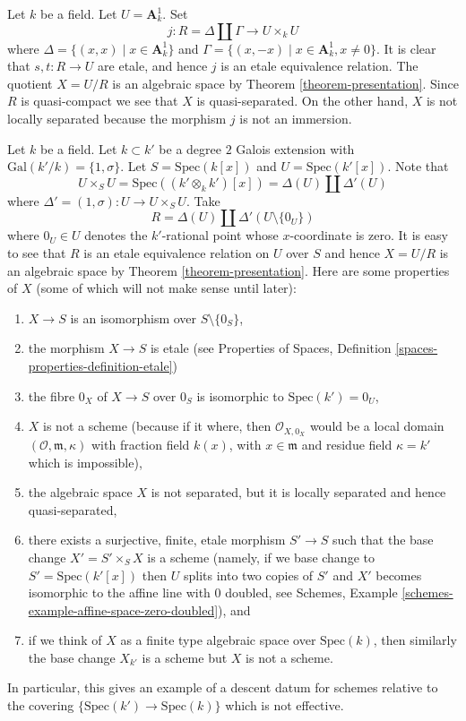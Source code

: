 \begin{example}
\label{example-affine-line-involution}
Let $k$ be a field. Let $U = \mathbf{A}^1_k$. Set
$$
j : R = \Delta \coprod \Gamma \longrightarrow U \times_k U
$$
where $\Delta = \{(x, x) \mid x \in \mathbf{A}^1_k\}$ and
$\Gamma = \{(x, -x) \mid x \in \mathbf{A}^1_k, x \not = 0\}$.
It is clear that $s, t : R \to U$ are etale, and hence
$j$ is an etale equivalence relation.
The quotient $X = U/R$ is an algebraic space by
Theorem \ref{theorem-presentation}.
Since $R$ is quasi-compact we see that $X$ is quasi-separated.
On the other hand, $X$ is not locally separated because
the morphism $j$ is not an immersion.
\end{example}

\begin{example}
\label{example-non-representable-descent}
Let $k$ be a field. Let $k \subset k'$ be a degree $2$ Galois extension
with $\text{Gal}(k'/k) = \{1, \sigma\}$. Let $S = \text{Spec}(k[x])$
and $U = \text{Spec}(k'[x])$. Note that
$$
U \times_S U =
\text{Spec}((k' \otimes_k k')[x]) =
\Delta(U) \coprod \Delta'(U)
$$
where $\Delta' = (1, \sigma) : U \to U \times_S U$. Take
$$
R = \Delta(U) \coprod \Delta'(U \setminus \{0_U\})
$$
where $0_U \in U$ denotes the $k'$-rational point whose $x$-coordinate is zero.
It is easy to see that $R$ is an etale equivalence relation on $U$ over $S$
and hence $X = U/R$ is an algebraic space by
Theorem \ref{theorem-presentation}. Here are some properties of $X$ (some
of which will not make sense until later):
\begin{enumerate}
\item $X \to S$ is an isomorphism over $S \setminus \{0_S\}$,
\item the morphism $X \to S$ is etale (see
Properties of Spaces,
Definition \ref{spaces-properties-definition-etale})
\item the fibre $0_X$ of $X \to S$ over $0_S$ is isomorphic to
$\text{Spec}(k') = 0_U$,
\item $X$ is not a scheme (because if it where, then $\mathcal{O}_{X, 0_X}$
would be a local domain $(\mathcal{O}, \mathfrak m, \kappa)$ with
fraction field $k(x)$, with $x \in \mathfrak m$ and residue field
$\kappa = k'$ which is impossible),
\item the algebraic space $X$ is not separated, but it is
locally separated and hence quasi-separated,
\item there exists a surjective, finite, etale morphism $S' \to S$
such that the base change $X' = S' \times_S X$ is a scheme (namely, if
we base change to $S' = \text{Spec}(k'[x])$ then $U$ splits into
two copies of $S'$ and $X'$ becomes isomorphic to the affine line with
$0$ doubled, see
Schemes, Example \ref{schemes-example-affine-space-zero-doubled}), and
\item if we think of $X$ as a finite type algebraic space over
$\text{Spec}(k)$, then similarly the base change $X_{k'}$ is a scheme
but $X$ is not a scheme.
\end{enumerate}
In particular, this gives an example of a descent datum for schemes
relative to the covering $\{\text{Spec}(k') \to \text{Spec}(k)\}$
which is not effective.
\end{example}

